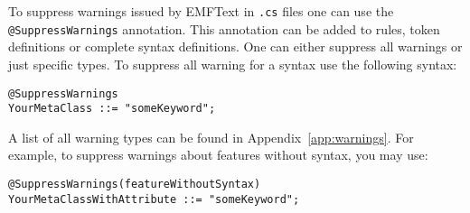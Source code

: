 To suppress warnings issued by EMFText in \texttt{.cs} files one can use the
\texttt{@SuppressWarnings} annotation. This annotation can be added to rules,
token definitions or complete syntax definitions. One can either suppress all 
warnings or just specific types. To suppress all warning for a syntax use the
following syntax:

\begin{lstlisting}
@SuppressWarnings
YourMetaClass ::= "someKeyword";
\end{lstlisting}

A list of all warning types can be found in Appendix~\ref{app:warnings}. For
example, to suppress warnings about features without syntax, you may use:

\begin{lstlisting}
@SuppressWarnings(featureWithoutSyntax)
YourMetaClassWithAttribute ::= "someKeyword";
\end{lstlisting}
